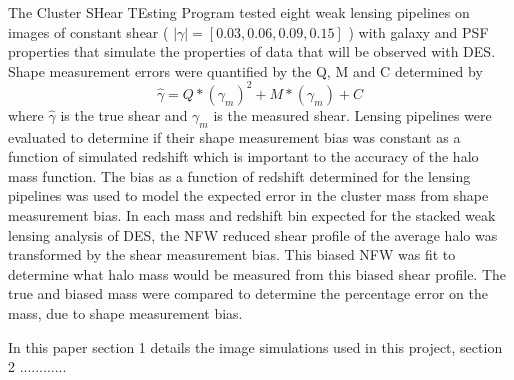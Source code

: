 The Cluster SHear TEsting Program tested eight weak lensing pipelines on images of constant shear
( $|\gamma| = [0.03, 0.06, 0.09, 0.15]$ ) with galaxy and PSF properties that simulate the properties
of data that will be observed with DES. Shape measurement errors were quantified by the Q, M and C
determined by 
\begin{equation}
\hat{\gamma} = Q*(\gamma_m)^2 + M*(\gamma_m) + C
\end {equation}
where $\hat{\gamma}$ is the true shear and $\gamma_m$ is the measured shear. Lensing pipelines
were evaluated to determine if their shape measurement bias was constant as a function of simulated redshift which is important to the accuracy of the halo mass function. The bias as a function of redshift determined for the lensing pipelines was used to model the expected error in the cluster mass from shape measurement bias. In each mass and redshift bin expected for the stacked weak lensing analysis of DES, the NFW reduced shear profile of the average halo was transformed by the shear measurement bias. This biased NFW was fit to determine what halo mass
would be measured from this biased shear profile. The true and biased mass were compared to determine the percentage error on the mass, due to shape measurement bias.

In this paper section 1 details the image simulations used in this project, section 2 ............